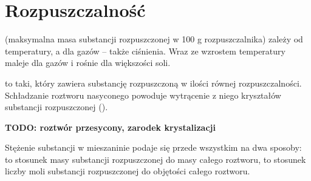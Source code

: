 
\section{Rozpuszczalność}
 (maksymalna masa substancji rozpuszczonej w 100 g rozpuszczalnika) zależy od temperatury, a dla gazów -- także ciśnienia.
Wraz ze wzrostem temperatury maleje dla gazów i rośnie dla większości soli.

 to taki, który zawiera substancję rozpuszczoną w ilości równej rozpuszczalności.
Schładzanie roztworu nasyconego powoduje wytrącenie z niego kryształów substancji rozpuszczonej ().

\textbf{TODO: roztwór przesycony, zarodek krystalizacji}

Stężenie substancji w mieszaninie podaje się przede wszystkim na dwa sposoby:  to stosunek masy substancji rozpuszczonej do masy całego roztworu,  to stosunek liczby moli substancji rozpuszczonej do objętości całego roztworu.